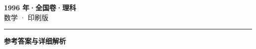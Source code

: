 \documentclass[zihao=5, a4paper]{ctexart}
\begin{document}
\begin{center}
  {\Large\bfseries 1996 年·全国卷·理科}\\[4pt]
  {\large 数学 · 印刷版}
\end{center}
\medskip
{}

\par\bigskip\hrule\bigskip
{}
\begin{center}{\large\bfseries 参考答案与详细解析}\end{center}
\smallskip

\end{document}
